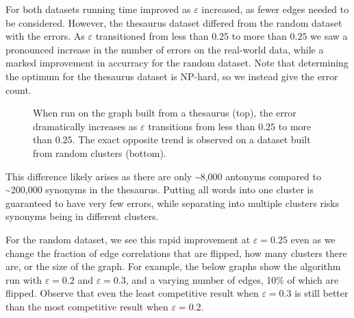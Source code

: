 \documentclass[
]{article}
\begin{document}
For both datasets running time improved as {\(\varepsilon\)} increased,
as fewer edges needed to be considered. However, the thesaurus dataset
differed from the random dataset with the errors. As {\(\varepsilon\)}
transitioned from less than {\(0.25\)} to more than {\(0.25\)} we saw a
pronounced increase in the number of errors on the real-world data,
while a marked improvement in accurracy for the random dataset. Note
that determining the optimum for the thesaurus dataset is NP-hard, so we
instead give the error count.

\begin{figure}[!htb]
  \caption{\label{fig:opposite-trends}
    When run on the graph built from a thesaurus (top), the error dramatically increases
    as $\varepsilon$ transitions from less than $0.25$ to more than $0.25$. The exact
    opposite trend is observed on a dataset built from random clusters (bottom).}
\end{figure}
This difference likely arises as there are only \textasciitilde8,000
antonyms compared to \textasciitilde200,000 synonyms in the thesaurus.
Putting all words into one cluster is guaranteed to have very few
errors, while separating into multiple clusters risks synonyms being in
different clusters.

For the random dataset, we see this rapid improvement at
  {\(\varepsilon = 0.25\)} even as we change the fraction of edge
correlations that are flipped, how many clusters there are, or the size
of the graph. For example, the below graphs show the algorithm run with
  {\(\varepsilon = 0.2\)} and {\(\varepsilon = 0.3\)}, and a varying
number of edges, 10\% of which are flipped. Observe that even the least
competitive result when $\varepsilon = 0.3$ is still better than the most
competitive result when $\varepsilon = 0.2$.
\end{document}
